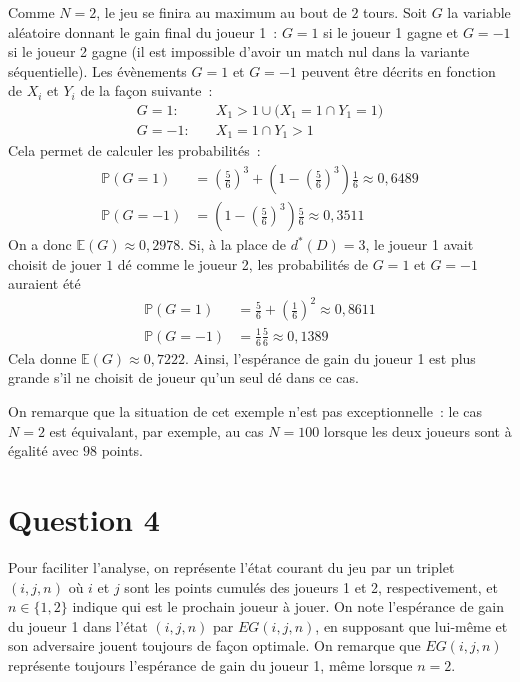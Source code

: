 \documentclass[a4paper,11pt]{amsart}
\theoremstyle{plain}
\begin{document}
Comme $N = 2$, le jeu se finira au maximum au bout de $2$ tours. Soit $G$ la variable aléatoire donnant le gain final du joueur 1~: $G = 1$ si le joueur 1 gagne et $G = -1$ si le joueur 2 gagne (il est impossible d'avoir un match nul dans la variante séquentielle). Les évènements $G = 1$ et $G = -1$ peuvent être décrits en fonction de $X_i$ et $Y_i$ de la façon suivante~:
\begin{align*}
G = 1 : \quad & X_1 > 1 \cup \bigl(X_1 = 1 \cap Y_1 = 1\bigr) \\
G = -1 : \quad & X_1 = 1 \cap Y_1 > 1
\end{align*}
Cela permet de calculer les probabilités~:
\begin{align*}
\mathbb P(G = 1) & = \left(\frac{5}{6}\right)^3 + \left(1 - \left(\frac{5}{6}\right)^3\right)\frac{1}{6} \approx 0,6489\\
\mathbb P(G = -1) & = \left(1 - \left(\frac{5}{6}\right)^3\right) \frac{5}{6} \approx 0,3511
\end{align*}
On a donc $\mathbb E(G) \approx 0,2978$. Si, à la place de $d^\ast(D) = 3$, le joueur 1 avait choisit de jouer $1$ dé comme le joueur 2, les probabilités de $G = 1$ et $G = -1$ auraient été
\begin{align*}
\mathbb P(G = 1) & = \frac{5}{6} + \left(\frac{1}{6}\right)^2 \approx 0,8611\\
\mathbb P(G = -1) & = \frac{1}{6} \frac{5}{6} \approx 0,1389
\end{align*}
Cela donne $\mathbb E(G) \approx 0,7222$. Ainsi, l'espérance de gain du joueur 1 est plus grande s'il ne choisit de joueur qu'un seul dé dans ce cas.

On remarque que la situation de cet exemple n'est pas exceptionnelle~: le cas $N = 2$ est équivalant, par exemple, au cas $N = 100$ lorsque les deux joueurs sont à égalité avec $98$ points.

\section{Question 4}

Pour faciliter l'analyse, on représente l'état courant du jeu par un triplet $(i, j, n)$ où $i$ et $j$ sont les points cumulés des joueurs 1 et 2, respectivement, et $n \in \{1, 2\}$ indique qui est le prochain joueur à jouer. On note l'espérance de gain du joueur 1 dans l'état $(i, j, n)$ par $EG(i, j, n)$, en supposant que lui-même et son adversaire jouent toujours de façon optimale. On remarque que $EG(i, j, n)$ représente toujours l'espérance de gain du joueur 1, même lorsque $n = 2$.
\end{document}
